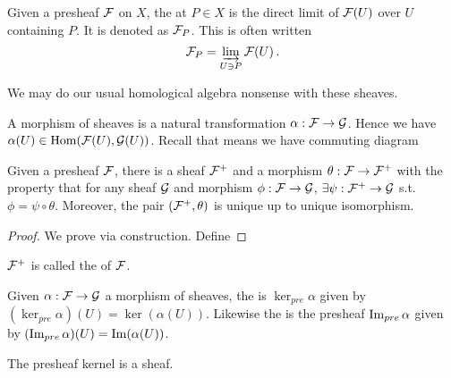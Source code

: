 \documentclass{article}
\begin{document}
\begin{definition}
	Given a presheaf $\mathcal{F}$ on $X$, the  at $P\in X$ is the direct limit of $\mathcal{F}(U)$ over $U$ containing $P$. It is denoted as $\mathcal{F}_P$. This is often written
	\[
	\mathcal{F}_P = \varinjlim_{U \ni P} \mathcal{F}(U) \, .
	\]  
\end{definition}

We may do our usual homological algebra nonsense with these sheaves. 

\begin{definition}
	A morphism of sheaves is a natural transformation $\alpha : \mathcal{F} \to \mathcal{G}$. Hence we have $\alpha(U) \in \operatorname{Hom}(\mathcal{F}(U),\mathcal{G}(U))$. Recall that means we have commuting diagram 
	\begin{center}
	\end{center}
\end{definition}


\begin{prop}
	Given a presheaf $\mathcal{F}$, there is a sheaf $\mathcal{F}^+$ and a morphism $\theta : \mathcal{F} \to \mathcal{F}^+$ with the property that for any sheaf $\mathcal{G}$ and morphism $\phi: \mathcal{F} \to \mathcal{G}$, $\exists \psi: \mathcal{F}^+ \to \mathcal{G}$ s.t. $\phi = \psi \circ \theta$. Moreover, the pair $(\mathcal{F}^+, \theta)$ is unique up to unique isomorphism.
\end{prop}
\begin{proof}
	We prove via construction. Define 
\end{proof}

\begin{definition}
	$\mathcal{F}^+$ is called the  of $\mathcal{F}$. 
\end{definition}

\begin{definition}
	Given $\alpha: \mathcal{F} \to \mathcal{G}$ a morphism of sheaves, the  is $\ker_{pre}\alpha$ given by $(\ker_{pre}\alpha)(U) = \ker (\alpha(U))$. Likewise the  is the presheaf $\operatorname{Im}_{pre}\alpha$ given by $(\operatorname{Im}_{pre}\alpha)(U) =  \operatorname{Im}(\alpha(U))$.  
\end{definition}

\begin{prop}
	The presheaf kernel is a sheaf. 
\end{prop}
\end{document}
